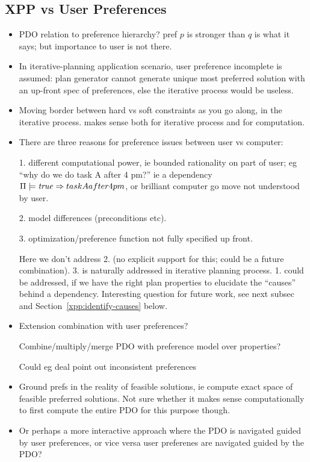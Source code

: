 \subsection{XPP vs User Preferences}

\begin{itemize}
\item PDO relation to preference hierarchy? pref $p$ is stronger than
  $q$ is what it says; but importance to user is not there.

\item In iterative-planning application scenario, user preference
  incomplete is assumed: plan generator cannot generate unique most
  preferred solution with an up-front spec of preferences, else the
  iterative process would be useless.

\item Moving border between hard vs soft constraints as you go along,
  in the iterative process. makes sense both for iterative process and
  for computation.

\item There are three reasons for preference issues between user vs
  computer:

  1. different computational power, ie bounded rationality on part of
  user; eg ``why do we do task A after 4 pm?'' ie a dependency
  $\Pi \models \mathit{true} \Rightarrow taskAafter4pm$, or brilliant computer go
  move not understood by user.

  2. model differences (preconditions etc).

  3. optimization/preference function not fully specified up front.

  Here we don't address 2. (no explicit support for this; could be a
  future combination). 3. is naturally addressed in iterative planning
  process. 1. could be addressed, if we have the right plan properties
  to elucidate the ``causes'' behind a dependency. Interesting
  question for future work, see next subsec and
  Section~\ref{xpp:identify-causes} below.

\item Extension combination with user preferences?

  Combine/multiply/merge PDO with preference model over properties?

  Could eg deal point out inconsistent preferences

\item Ground prefs in the reality of feasible solutions, ie compute
  exact space of feasible preferred solutions. Not sure whether it
  makes sense computationally to first compute the entire PDO for this
  purpose though.

\item Or perhaps a more interactive approach where the PDO is
  navigated guided by user preferences, or vice versa user preferenes
  are navigated guided by the PDO?

\end{itemize}







